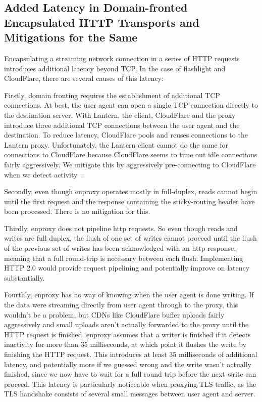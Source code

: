 \documentclass{sig-alternate}
\begin{document}
\subsection{Added Latency in Domain-fronted Encapsulated HTTP Transports and
Mitigations for the Same}
Encapsulating a streaming network connection in a series of HTTP requests
introduces additional latency beyond TCP. In the case of flashlight and
CloudFlare, there are several causes of this latency:

Firstly, domain fronting requires the establishment of additional TCP
connections. At best, the user agent can open a single TCP
connection directly to the destination server. With Lantern, the client,
CloudFlare and the proxy introduce three additional TCP connections between the
user agent and the destination. To reduce latency, CloudFlare pools and reuses
connections to the Lantern proxy. Unfortunately, the Lantern client cannot do
the same for connections to CloudFlare because CloudFlare seems to time out
idle connections fairly aggressively. We mitigate this by aggressively
pre-connecting to CloudFlare when we detect activity~\cite{connpool}.

Secondly, even though enproxy operates mostly in full-duplex, reads cannot
begin until the first request and the response containing the
sticky-routing header have been processed. There is no mitigation for this.

Thirdly, enproxy does not pipeline http requests. So even though reads and
writes are full duplex, the flush of one set of writes cannot proceed until the
flush of the previous set of writes has been acknowledged with an http response,
meaning that a full round-trip is necessary between each flush. Implementing
HTTP 2.0 would provide request pipelining and potentially improve on latency
substantially.

Fourthly, enproxy has no way of knowing when the user agent is done
writing. If the data were streaming directly from user agent through to
the proxy, this wouldn't be a problem, but CDNs like CloudFlare buffer
uploads fairly aggressively and small uploads aren't actually forwarded to
the proxy until the HTTP request is finished. enproxy assumes that a
writer is finished if it detects inactivity for more than 35 milliseconds,
at which point it flushes the write by finishing the HTTP request. This
introduces at least 35 milliseconds of additional latency, and potentially
more if we guessed wrong and the write wasn't actually finished, since we
now have to wait for a full round trip before the next write can proceed.
This latency is particularly noticeable when proxying TLS traffic, as the
TLS handshake consists of several small messages between user agent and server.
\end{document}
